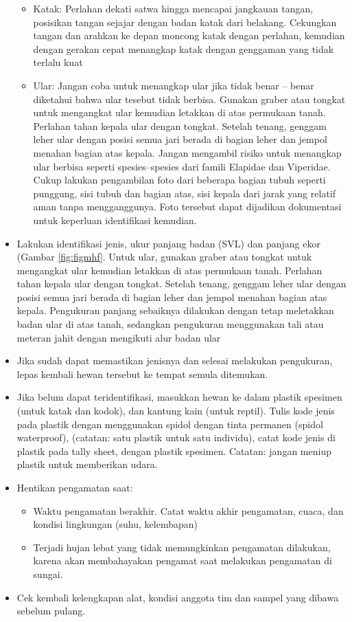 \documentclass[
]{book}
\providecommand{\tightlist}{%
  \setlength{\itemsep}{0pt}\setlength{\parskip}{0pt}}
\begin{document}
\begin{itemize}
  \begin{itemize}
  \tightlist
  \item
    Katak: Perlahan dekati satwa hingga mencapai jangkauan tangan, posisikan tangan sejajar dengan badan katak dari belakang. Cekungkan tangan dan arahkan ke depan moncong katak dengan perlahan, kemudian dengan gerakan cepat menangkap katak dengan genggaman yang tidak terlalu kuat
  \item
    Ular: Jangan coba untuk menangkap ular jika tidak benar -- benar diketahui bahwa ular tesebut tidak berbisa. Gunakan graber atau tongkat untuk mengangkat ular kemudian letakkan di atas permukaan tanah. Perlahan tahan kepala ular dengan tongkat. Setelah tenang, genggam leher ular dengan posisi semua jari berada di bagian leher dan jempol menahan bagian atas kepala. Jangan mengambil risiko untuk menangkap ular berbisa seperti spesies--spesies dari famili Elapidae dan Viperidae. Cukup lakukan pengambilan foto dari beberapa bagian tubuh seperti punggung, sisi tubuh dan bagian atas, sisi kepala dari jarak yang relatif aman tanpa mengganggunya. Foto tersebut dapat dijadikan dokumentasi untuk keperluan identifikasi kemudian.\\
  \end{itemize}
\item
  Lakukan identifikasi jenis, ukur panjang badan (SVL) dan panjang ekor (Gambar \ref{fig:figmhf}. Untuk ular, gunakan graber atau tongkat untuk mengangkat ular kemudian letakkan di atas permukaan tanah. Perlahan tahan kepala ular dengan tongkat. Setelah tenang, genggam leher ular dengan posisi semua jari berada di bagian leher dan jempol menahan bagian atas kepala. Pengukuran panjang sebaiknya dilakukan dengan tetap meletakkan badan ular di atas tanah, sedangkan pengukuran menggunakan tali atau meteran jahit dengan mengikuti alur badan ular
\item
  Jika sudah dapat memastikan jenisnya dan selesai melakukan pengukuran, lepas kembali hewan tersebut ke tempat semula ditemukan.
\item
  Jika belum dapat teridentifikasi, masukkan hewan ke dalam plastik spesimen (untuk katak dan kodok), dan kantung kain (untuk reptil). Tulis kode jenis pada plastik dengan menggunakan spidol dengan tinta permanen (spidol waterproof), (catatan: satu plastik untuk satu individu), catat kode jenis di plastik pada tally sheet, dengan plastik spesimen. Catatan: jangan meniup plastik untuk memberikan udara.
\item
  Hentikan pengamatan saat:

  \begin{itemize}
  \tightlist
  \item
    Waktu pengamatan berakhir. Catat waktu akhir pengamatan, cuaca, dan kondisi lingkungan (suhu, kelembapan)
  \item
    Terjadi hujan lebat yang tidak memungkinkan pengamatan dilakukan, karena akan membahayakan pengamat saat melakukan pengamatan di sungai.
  \end{itemize}
\item
  Cek kembali kelengkapan alat, kondisi anggota tim dan sampel yang dibawa sebelum pulang.
\end{itemize}
\end{document}
